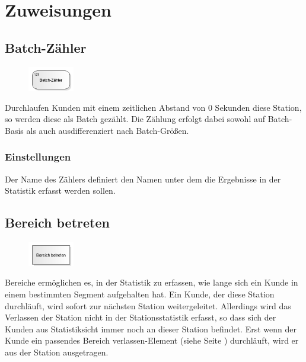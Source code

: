 \chapter{Zuweisungen}

\section{Batch-Zähler}
\label{ref:ModelElementCounterBatch}

\begin{figure}
\vspace{-22pt}
\includegraphics[width=2cm]{imageModelElementCounterBatch.png}
\vspace{-22pt}
\end{figure}

Durchlaufen Kunden mit einem zeitlichen Abstand von 0 Sekunden diese Station, so werden diese
als Batch gezählt. Die Zählung erfolgt dabei sowohl auf Batch-Basis als auch ausdifferenziert
nach Batch-Größen.

\subsection*{Einstellungen}

Der Name des Zählers definiert den Namen unter dem die Ergebnisse in der Statistik erfasst werden sollen.


\section{Bereich betreten}
\label{ref:ModelElementSectionStart}

\begin{figure}
\vspace{-22pt}
\includegraphics[width=2cm]{imageModelElementSectionStart.png}
\vspace{-22pt}
\end{figure}

Bereiche ermöglichen es, in der Statistik zu erfassen, wie lange sich ein Kunde in einem bestimmten
Segment aufgehalten hat. Ein Kunde, der diese Station durchläuft, wird sofort zur nächsten Station
weitergeleitet. Allerdings wird das Verlassen der Station nicht in der Stationsstatistik erfasst,
so dass sich der Kunden aus Statistiksicht immer noch an dieser Station befindet. Erst wenn der
Kunde ein passendes Bereich verlassen-Element (siehe Seite \pageref{ref:ModelElementSectionEnd}) durchläuft,
wird er aus der Station ausgetragen.


